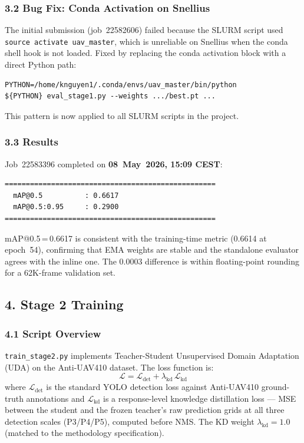 \subsubsection*{3.2 Bug Fix: Conda Activation on Snellius}

The initial submission (job~22582606) failed because the SLURM
script used \texttt{source activate uav\_master}, which is
unreliable on Snellius when the conda shell hook is not loaded.
Fixed by replacing the conda activation block with a direct
Python path:
\begin{verbatim}
PYTHON=/home/knguyen1/.conda/envs/uav_master/bin/python
${PYTHON} eval_stage1.py --weights .../best.pt ...
\end{verbatim}
This pattern is now applied to all SLURM scripts in the project.

\subsubsection*{3.3 Results}

Job~22583396 completed on \textbf{08~May~2026, 15:09 CEST}:

\begin{verbatim}
==================================================
  mAP@0.5          : 0.6617
  mAP@0.5:0.95     : 0.2900
==================================================
\end{verbatim}

mAP@0.5\,=\,0.6617 is consistent with the training-time metric
(0.6614 at epoch~54), confirming that EMA weights are stable and
the standalone evaluator agrees with the inline one. The 0.0003
difference is within floating-point rounding for a 62K-frame
validation set.

\subsection*{4. Stage 2 Training}

\subsubsection*{4.1 Script Overview}

\texttt{train\_stage2.py} implements Teacher-Student
Unsupervised Domain Adaptation (UDA) on the Anti-UAV410 dataset.
The loss function is:
\[
    \mathcal{L} = \mathcal{L}_{\text{det}}
                + \lambda_{\text{kd}}\,\mathcal{L}_{\text{kd}}
\]
where $\mathcal{L}_{\text{det}}$ is the standard YOLO detection
loss against Anti-UAV410 ground-truth annotations and
$\mathcal{L}_{\text{kd}}$ is a response-level knowledge
distillation loss — MSE between the student and the frozen
teacher's raw prediction grids at all three detection scales
(P3/P4/P5), computed before NMS. The KD weight $\lambda_{\text{kd}}
= 1.0$ (matched to the methodology specification).


